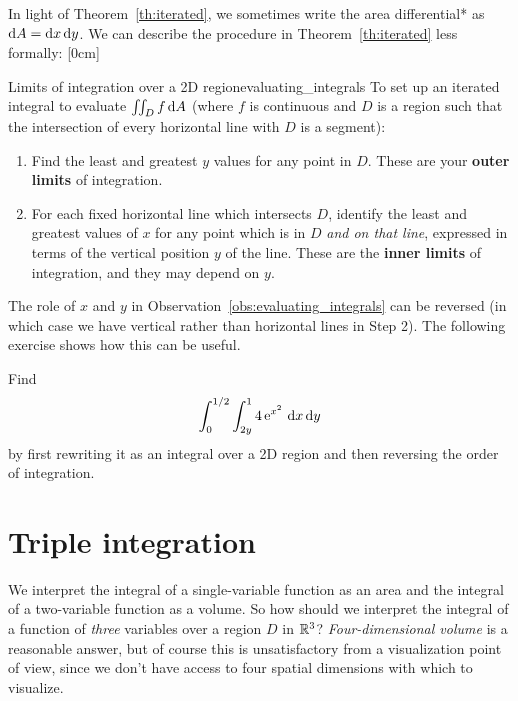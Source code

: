 \documentclass{watsonbook}
\begin{document}
In light of Theorem~\ref{th:iterated}, we sometimes write the area
differential* as $\mathrm{d} A = \mathrm{d} x \, \mathrm{d} y$. We can describe the procedure
in Theorem~\ref{th:iterated} less formally: [0cm]
\begin{obs}{Limits of integration over a 2D
    region}{evaluating_integrals}
  To set up an iterated integral to evaluate $\iint_D f \, {\mathrm{d}}A$
  (where $f$ is continuous and $D$ is a region such that the
  intersection of every horizontal line with $D$ is a segment):
  \begin{enumerate}[leftmargin=12pt, itemsep = 6pt, topsep = 5pt]
  \item Find the least and greatest $y$ values for any point in
    $D$. These are your \textbf{outer limits} of integration. 
  \item For each fixed horizontal line which intersects $D$, identify
    the least and greatest values of $x$ for any point which is in $D$
    \textit{and on that line}, expressed in terms of the vertical
    position $y$ of the line. These are the \textbf{inner limits} of
    integration, and they may depend on $y$.
  \end{enumerate}
\end{obs}

The role of $x$ and $y$ in Observation~\ref{obs:evaluating_integrals}
can be reversed (in which case we have vertical rather than horizontal
lines in Step 2). The following exercise shows how this can be useful.

\begin{exercise}{}{}
  Find
  \[
    \int_0^{1/2} \int_{2y}^1 4 \operatorname{e}^{x^2}\, \mathrm{d} x\, \mathrm{d} y
  \]
  by first rewriting it as an integral over a 2D region and then
  reversing the order of integration.
\end{exercise}


\section{Triple integration} \label{sec:triple} 


We interpret the integral of a single-variable function as an area and
the integral of a two-variable function as a volume. So how should we
interpret the integral of a function of \textit{three} variables over
a region $D$ in $\mathbb{R}^3$?  \textit{Four-dimensional volume} is a
reasonable answer, but of course this is unsatisfactory from a
visualization point of view, since we don't have access to four
spatial dimensions with which to visualize.
\end{document}
